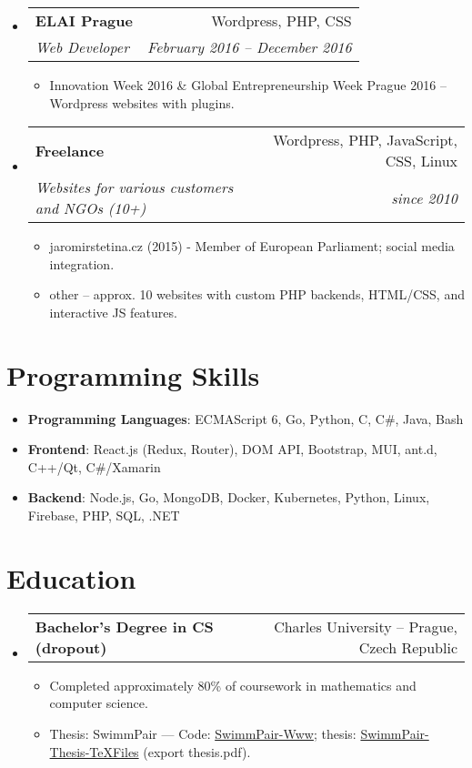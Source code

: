 \documentclass[letterpaper,11pt]{article}
\makeatletter
\newcommand{\sitem}[1]{\item #1 \vspace{-2pt}}
\newcommand{\resumeSubheading}[4]{
  \vspace{-1pt}\item
    \begin{tabular*}{0.97\textwidth}[t]{l@{\extracolsep{\fill}}r}
      \textbf{#1} & #2 \\
      \textit{\small#3} & \textit{\small #4} \\
    \end{tabular*}\vspace{-5pt}
}
\newcommand{\resumeSubheadingg}[2]{
  \vspace{-1pt}\item
    \begin{tabular*}{0.97\textwidth}[t]{l@{\extracolsep{\fill}}r}
      \textbf{#1} & #2
    \end{tabular*}\vspace{-5pt}
}
\newenvironment{subheadingListing}{\begin{itemize}[leftmargin=*]}{\end{itemize}}
\newenvironment{resumeList}{\begin{itemize}}{\end{itemize}\vspace{-5pt}}
\newcommand{\CC}{C\nolinebreak\hspace{-.05em}\raisebox{.4ex}{\tiny\bf +}\nolinebreak\hspace{-.10em}\raisebox{.4ex}{\tiny\bf +}}
\makeatother
\begin{document}
\begin{subheadingListing}
  \resumeSubheading
  {ELAI Prague}{Wordpress, PHP, CSS}
  {Web Developer}{February 2016 – December 2016}
  \begin{resumeList}
\sitem{Innovation Week 2016 \& Global Entrepreneurship Week Prague 2016 – Wordpress websites with plugins.}
 \end{resumeList}

  \resumeSubheading
  {Freelance}{Wordpress, PHP, JavaScript, CSS, Linux}
  {Websites for various customers and NGOs (10+)}{since 2010}
  \begin{resumeList}
    \sitem{jaromirstetina.cz (2015) - Member of European Parliament; social media integration.}
    \sitem{other – approx. 10 websites with custom PHP backends, HTML/CSS, and interactive JS features.}

  \end{resumeList}

\end{subheadingListing}


\section{Programming Skills}
\begin{subheadingListing}
  \sitem{
    \textbf{Programming Languages}{: ECMAScript 6, Go, Python, \CC, C\#, Java, Bash}
  }
  \sitem{
    \textbf{Frontend}{: React.js (Redux, Router), DOM API, Bootstrap, MUI, ant.d, C++/Qt, C\#/Xamarin}
  }
  \sitem{
    \textbf{Backend}{: Node.js, Go, MongoDB, Docker, Kubernetes, Python, Linux, Firebase, PHP, SQL, .NET}
  }
\end{subheadingListing}


\section{Education}
\begin{subheadingListing}

  \resumeSubheadingg
  {Bachelor's Degree in CS (dropout)}{Charles University – Prague, Czech Republic}

  \begin{resumeList}
  \sitem{Completed approximately 80\% of coursework in mathematics and computer science.}
    \sitem{Thesis: SwimmPair --- Code: \href{https://github.com/KlosStepan/SwimmPair-Www}{SwimmPair-Www}; thesis: \href{https://github.com/KlosStepan/SwimmPair-Thesis-TeXFiles}{SwimmPair-Thesis-TeXFiles} (export thesis.pdf).}
  \end{resumeList}
\end{subheadingListing}
\end{document}
